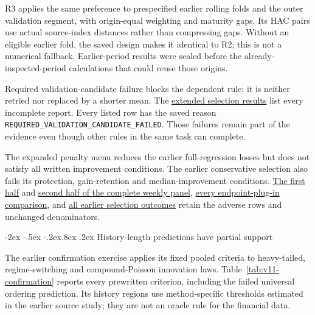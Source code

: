 \documentclass[12pt,a4paper]{article}
\makeatletter
\renewcommand\section{\@startsection{section}{1}{\z@}%
  {-2ex \@plus -.5ex \@minus -.2ex}{.8ex \@plus .2ex}%
  {\normalfont\large\bfseries}}
\makeatother
\begin{document}
R3 applies the same preference to prespecified earlier rolling folds and the
outer validation segment, with origin-equal weighting and maturity gaps.
Its HAC pairs use actual source-index distances rather than compressing gaps.
Without an eligible earlier fold, the saved design makes it identical to R2;
this is not a numerical fallback. Earlier-period results were sealed before
the already-inspected-period calculations that could reuse those origins.

Required validation-candidate failure blocks the dependent rule;
it is neither retried nor replaced by a shorter mean. The \href{https://github.com/ByronLi0207/financial-mathematics-paper-20261020/blob/submission-final/EXTENDED_RESULTS.md#asmbi-extended-s15}{extended selection results} list every incomplete report. Every listed row has the saved reason
\texttt{REQUIRED\_VALIDATION\_CANDIDATE\_FAILED}. Those failures remain part of
the evidence even though other rules in the same task can complete.

The expanded penalty menu reduces the earlier full-regression losses but does not satisfy all written improvement conditions. The earlier conservative selection also fails its protection, gain-retention and median-improvement conditions. \href{https://github.com/ByronLi0207/financial-mathematics-paper-20261020/blob/submission-final/EXTENDED_RESULTS.md#asmbi-extended-s11}{The first half} and \href{https://github.com/ByronLi0207/financial-mathematics-paper-20261020/blob/submission-final/EXTENDED_RESULTS.md#asmbi-extended-s12}{second half of the complete weekly panel}, \href{https://github.com/ByronLi0207/financial-mathematics-paper-20261020/blob/submission-final/EXTENDED_RESULTS.md#asmbi-extended-s13}{every endpoint-plug-in comparison}, and \href{https://github.com/ByronLi0207/financial-mathematics-paper-20261020/blob/submission-final/EXTENDED_RESULTS.md#asmbi-extended-s14}{all earlier selection outcomes} retain the adverse rows and unchanged denominators.

\FloatBarrier


\section{History-length predictions have partial support}\label{sup:v11-history}\label{sup:submission-wp2}

The earlier confirmation exercise applies its fixed pooled criteria to heavy-tailed, regime-switching and compound-Poisson innovation laws. Table~\ref{tab:v11-confirmation} reports every prewritten criterion, including the failed universal ordering prediction. Its history regions use method-specific thresholds estimated in the earlier source study; they are not an oracle rule for the financial data.
\end{document}
